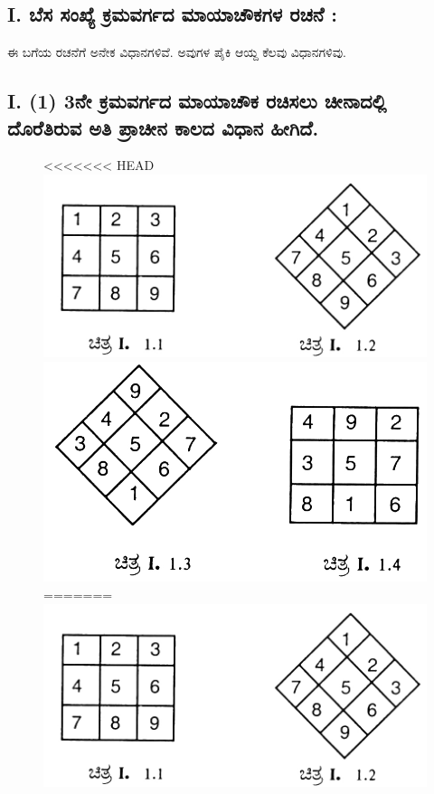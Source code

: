 \subsection*{I. ಬೆಸ ಸಂಖ್ಯೆ ಕ್ರಮವರ್ಗದ ಮಾಯಾಚೌಕಗಳ ರಚನೆ :}

ಈ ಬಗೆಯ ರಚನೆಗೆ ಅನೇಕ ವಿಧಾನಗಳಿವೆ. ಅವುಗಳ ಪೈಕಿ ಆಯ್ದ ಕೆಲವು ವಿಧಾನಗಳಿವು.

\subsection*{I. (1) 3ನೇ ಕ್ರಮವರ್ಗದ ಮಾಯಾಚೌಕ ರಚಿಸಲು ಚೀನಾದಲ್ಲಿ ದೊರೆತಿರುವ ಅತಿ ಪ್ರಾಚೀನ ಕಾಲದ ವಿಧಾನ ಹೀಗಿದೆ.}
\begin{figure}[h]
<<<<<<< HEAD
\includegraphics{src/figures/chap3/fig3-1.jpg}\\
\includegraphics{src/figures/chap3/fig3-2.jpg}
=======
\includegraphics[scale=.8]{src/figures/chap3/fig3.1.jpg}\\[5pt]

\end{figure}
